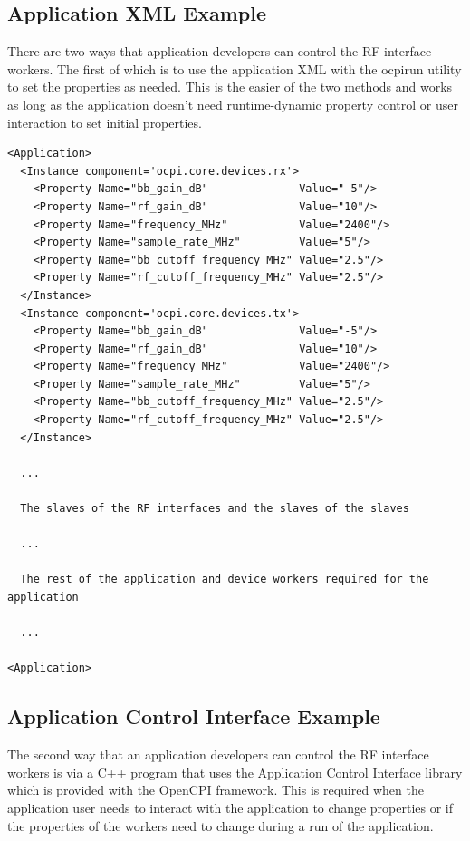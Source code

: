 \subsection{Application XML Example}
There are two ways that application developers can control the RF interface workers.  The first of which is to use the application XML with the ocpirun utility to set the properties as needed.  This is the easier of the two methods and works as long as the application doesn't need runtime-dynamic property control or user interaction to set initial properties.

\begin{verbatim}
<Application>
  <Instance component='ocpi.core.devices.rx'>
    <Property Name="bb_gain_dB"              Value="-5"/>
    <Property Name="rf_gain_dB"              Value="10"/>
    <Property Name="frequency_MHz"           Value="2400"/>
    <Property Name="sample_rate_MHz"         Value="5"/>
    <Property Name="bb_cutoff_frequency_MHz" Value="2.5"/>
    <Property Name="rf_cutoff_frequency_MHz" Value="2.5"/>
  </Instance>
  <Instance component='ocpi.core.devices.tx'>
    <Property Name="bb_gain_dB"              Value="-5"/>
    <Property Name="rf_gain_dB"              Value="10"/>
    <Property Name="frequency_MHz"           Value="2400"/>
    <Property Name="sample_rate_MHz"         Value="5"/>
    <Property Name="bb_cutoff_frequency_MHz" Value="2.5"/>
    <Property Name="rf_cutoff_frequency_MHz" Value="2.5"/>
  </Instance>

  ...

  The slaves of the RF interfaces and the slaves of the slaves

  ...

  The rest of the application and device workers required for the application

  ...

<Application>
\end{verbatim}

\newpage
\subsection{Application Control Interface Example}
The second way that an application developers can control the RF interface workers is via a C++ program that uses the Application Control Interface library which is provided with the OpenCPI framework.  This is required when the application user needs to interact with the application to change properties or if the properties of the workers need to change during a run of the application.

